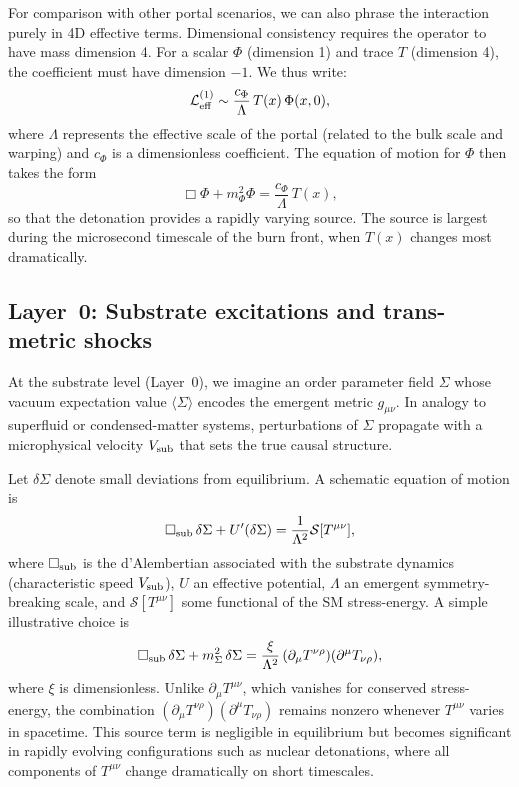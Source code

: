 \documentclass[aps,prd,twocolumn,nofootinbib,superscriptaddress]{revtex4-2}
\begin{document}
For comparison with other portal scenarios, we can also phrase the interaction purely in 4D effective terms. Dimensional consistency requires the operator to have mass dimension 4. For a scalar $\Phi$ (dimension 1) and trace $T$ (dimension 4), the coefficient must have dimension $-1$. We thus write:
\begin{equation}
    \mathcal{L}_{\rm eff}^{(1)} \sim \frac{c_{\Phi}}{\Lambda} \, T(x) \, \Phi(x,0),
    \label{eq:L_eff_dim5}
\end{equation}
where $\Lambda$ represents the effective scale of the portal (related to the bulk scale and warping) and $c_{\Phi}$ is a dimensionless coefficient. The equation of motion for $\Phi$ then takes the form
\begin{equation}
    \Box \Phi + m_\Phi^2 \Phi = \frac{c_{\Phi}}{\Lambda} \, T(x),
    \label{eq:Phi_4d_eom}
\end{equation}
so that the detonation provides a rapidly varying source. The source is largest during the microsecond timescale of the burn front, when $T(x)$ changes most dramatically.

\subsection{Layer~0: Substrate excitations and trans-metric shocks}
\label{subsec:layer0_coupling}

At the substrate level (Layer~0), we imagine an order parameter field $\Sigma$ whose vacuum expectation value $\langle \Sigma \rangle$ encodes the emergent metric $g_{\mu\nu}$. In analogy to superfluid or condensed-matter systems, perturbations of $\Sigma$ propagate with a microphysical velocity $V_{\rm sub}$ that sets the true causal structure.

Let $\delta\Sigma$ denote small deviations from equilibrium. A schematic equation of motion is
\begin{equation}
    \Box_{\rm sub} \, \delta\Sigma
    + U'(\delta\Sigma)
    = \frac{1}{\Lambda^2} \mathcal{S}[T^{\mu\nu}],
    \label{eq:sigma_eom}
\end{equation}
where $\Box_{\rm sub}$ is the d'Alembertian associated with the substrate dynamics (characteristic speed $V_{\rm sub}$), $U$ an effective potential, $\Lambda$ an emergent symmetry-breaking scale, and $\mathcal{S}[T^{\mu\nu}]$ some functional of the SM stress-energy. A simple illustrative choice is
\begin{equation}
    \Box_{\rm sub} \, \delta\Sigma
    + m_\Sigma^2 \, \delta\Sigma
    = \frac{\xi}{\Lambda^2} \,
    (\partial_\mu T^{\nu\rho}) (\partial^\mu T_{\nu\rho}),
    \label{eq:sigma_source}
\end{equation}
where $\xi$ is dimensionless. Unlike $\partial_\mu T^{\mu\nu}$, which vanishes for conserved stress-energy, the combination $(\partial_\mu T^{\nu\rho})(\partial^\mu T_{\nu\rho})$ remains nonzero whenever $T^{\mu\nu}$ varies in spacetime. This source term is negligible in equilibrium but becomes significant in rapidly evolving configurations such as nuclear detonations, where all components of $T^{\mu\nu}$ change dramatically on short timescales.
\end{document}
